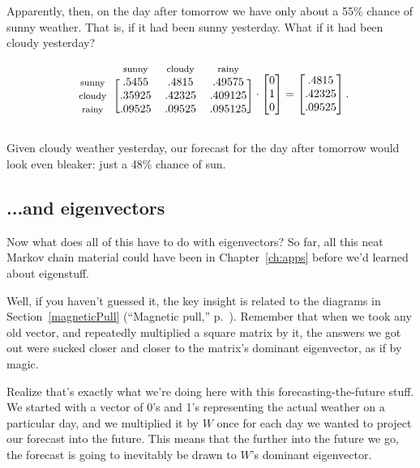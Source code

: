 \begin{alttitles}
Apparently, then, on the day after tomorrow we have only about a 55\% chance of
sunny weather. That is, if it had been sunny yesterday. What if it had been
cloudy yesterday?


\[
\begin{blockarray}{cccccc}
& {\footnotesize\textrm{sunny}} & {\footnotesize\textrm{cloudy}} &
{\footnotesize\textrm{rainy}} \\
\begin{block}{c[ccccc]}
{\footnotesize\textrm{sunny}} & .5455 & .4815 & .49575 \\
{\footnotesize\textrm{cloudy}} & .35925 & .42325 & .409125 \\
{\footnotesize\textrm{rainy}} & .09525 & .09525 & .095125 \\
\end{block}
\end{blockarray} \cdot
\begin{bmatrix}
0 \\ 1 \\ 0 \\
\end{bmatrix} =
\begin{bmatrix}
.4815 \\ .42325 \\ .09525
\end{bmatrix}.
\]

Given cloudy weather yesterday, our forecast for the day after tomorrow would
look even bleaker: just a 48\% chance of sun.

\subsection{...and eigenvectors}

Now what does all of this have to do with eigenvectors? So far, all this neat
Markov chain material could have been in Chapter~\ref{ch:apps} before we'd
learned about eigenstuff.

Well, if you haven't guessed it, the key insight is related to the diagrams in
Section~\ref{magneticPull} (``Magnetic pull,'' p.~\pageref{magneticPull}).
Remember that when we took any old vector, and repeatedly multiplied a square
matrix by it, the answers we got out were sucked closer and closer to the
matrix's dominant eigenvector, as if by magic.

Realize that's exactly what we're doing here with this forecasting-the-future
stuff. We started with a vector of 0's and 1's representing the actual weather
on a particular day, and we multiplied it by $W$ once for each day we wanted to
project our forecast into the future. This means that the further into the
future we go, the forecast is going to inevitably be drawn to $W$'s dominant
eigenvector.


\end{alttitles}
